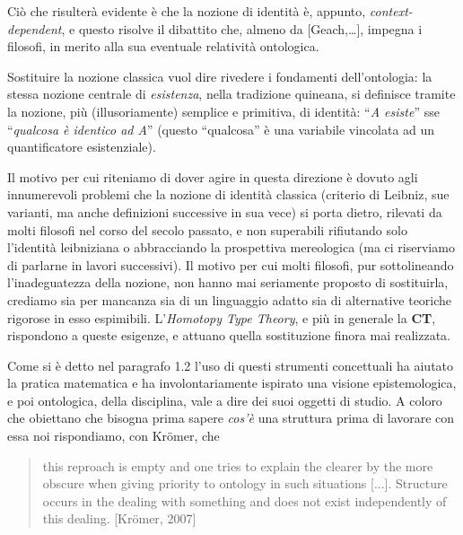 \documentclass[a4paper, 11pt]{article}
\begin{document}
	Ciò che risulterà evidente è che la nozione di identità è, appunto, \emph{context-dependent}, e questo risolve il dibattito che, almeno da [Geach,\dots], impegna i filosofi, in merito alla sua eventuale relatività ontologica. 
	
	Sostituire la nozione classica vuol dire rivedere i fondamenti dell'ontologia: la stessa nozione centrale di \emph{esistenza}, nella tradizione quineana, si definisce tramite la nozione, più (illusoriamente) semplice e primitiva, di identità: ``\textit{A esiste}'' sse ``\textit{qualcosa è identico ad A}'' (questo ``qualcosa'' è una variabile vincolata ad un quantificatore esistenziale).
	
	Il motivo per cui riteniamo di dover agire in questa direzione è dovuto agli innumerevoli problemi che la nozione di identità classica (criterio di Leibniz, sue varianti, ma anche definizioni successive in sua vece) si porta dietro, rilevati da molti filosofi nel corso del secolo passato, e non superabili rifiutando solo l'identità leibniziana o abbracciando la prospettiva mereologica (ma ci riserviamo di parlarne in lavori successivi). Il motivo per cui molti filosofi, pur sottolineando l'inadeguatezza della nozione, non hanno mai seriamente proposto di sostituirla, crediamo sia per mancanza sia di un linguaggio adatto sia di alternative teoriche rigorose in esso espimibili.
	L'\textit{Homotopy Type Theory}, e più in generale la \textbf{CT}, rispondono a queste esigenze, e attuano quella sostituzione finora mai realizzata. \endfo
	
	
	Come si è detto nel paragrafo 1.2 l'uso di questi strumenti concettuali ha aiutato la pratica matematica e ha involontariamente ispirato una visione epistemologica, e poi ontologica, della disciplina, vale a dire dei suoi oggetti di studio. A coloro che obiettano che bisogna prima sapere \textit{cos'è} una struttura prima di lavorare con essa noi rispondiamo, con Kr\"omer, che
	\begin{quotation}
		this reproach is empty and one tries to explain the clearer by the more obscure when giving priority to ontology in such situations [...]. Structure occurs in the dealing with something and does
		not exist independently of this dealing. [Kr\"omer, 2007]
	\end{quotation}
	
\end{document}
